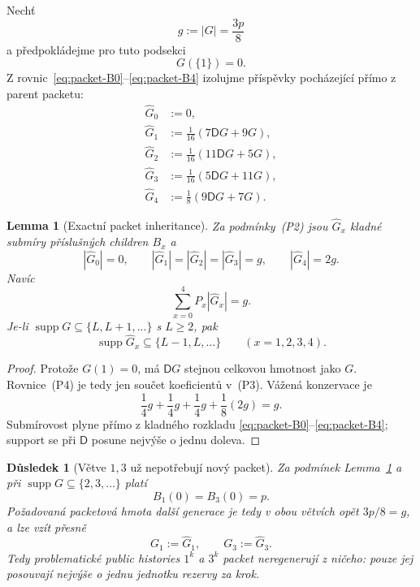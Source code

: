 \documentclass[11pt,a4paper]{article}
\newtheorem{lemma}[theorem]{Lemma}
\newtheorem{corollary}[theorem]{Důsledek}
\theoremstyle{definition}
\theoremstyle{remark}
\newcommand{\DOWN}{\mathsf D}
\newcommand{\supp}{\operatorname{supp}}
\begin{document}
Nech\v t
\[
g:=|G|=\frac{3p}{8}
\]
a p\v redpokl\'adejme pro tuto podsekci
\[
G(\{1\})=0.
\tag{P2}
\]
Z rovnic~\eqref{eq:packet-B0}--\eqref{eq:packet-B4} izolujme p\v r\'isp\v evky
poch\'azej\'ic\'i p\v r\'imo z parent packetu:
\begin{align}
\widehat G_0&:=0,\nonumber\\
\widehat G_1&:=\frac1{16}(7\DOWN G+9G),\nonumber\\
\widehat G_2&:=\frac1{16}(11\DOWN G+5G),\nonumber\\
\widehat G_3&:=\frac1{16}(5\DOWN G+11G),\nonumber\\
\widehat G_4&:=\frac1{8}(9\DOWN G+7G).
\tag{P3}
\end{align}

\begin{lemma}[Exactn\'i packet inheritance]
\label{lem:packet-inheritance}
Za podm\'inky~\textup{(P2)} jsou \(\widehat G_x\) kladn\'e subm\'iry
p\v r\'islu\v sn\'ych children \(B_x\) a
\[
\boxed{
|\widehat G_0|=0,\qquad
|\widehat G_1|=|\widehat G_2|=|\widehat G_3|=g,\qquad
|\widehat G_4|=2g.
}
\tag{P4}
\]
Nav\'ic
\[
\boxed{
\sum_{x=0}^4P_x|\widehat G_x|=g.
}
\tag{P5}
\]
Je-li \(\supp G\subseteq\{L,L+1,\ldots\}\) s \(L\ge2\), pak
\[
\supp\widehat G_x\subseteq\{L-1,L,\ldots\}
\qquad(x=1,2,3,4).
\tag{P6}
\]
\end{lemma}

\begin{proof}
Proto\v ze \(G(1)=0\), m\'a \(\DOWN G\) stejnou celkovou hmotnost jako
\(G\). Rovnice~\textup{(P4)} je tedy jen sou\v cet koeficient\r u
v~\textup{(P3)}. V\'a\v zen\'a konzervace je
\[
\frac14g+\frac14g+\frac14g+\frac18(2g)=g.
\]
Subm\'irovost plyne p\v r\'imo z kladn\'eho rozkladu
\eqref{eq:packet-B0}--\eqref{eq:packet-B4}; support se p\v ri
\(\DOWN\) posune nejv\'y\v se o jednu doleva.
\end{proof}

\begin{corollary}[V\v etve \(1,3\) u\v z nepot\v rebuj\'i nov\'y packet]
\label{cor:packet-13}
Za podm\'inek Lemma~\ref{lem:packet-inheritance} a p\v ri
\(\supp G\subseteq\{2,3,\ldots\}\) plat\'i
\[
B_1(0)=B_3(0)=p.
\]
Po\v zadovan\'a packetov\'a hmota dal\v s\'i generace je tedy v obou
v\v etv\'ich op\v et \(3p/8=g\), a lze vz\'it p\v resn\v e
\[
G_1:=\widehat G_1,\qquad G_3:=\widehat G_3.
\]
Tedy problematick\'e public histories \(1^k\) a \(3^k\) packet
\emph{neregeneruj\'i z ni\v ceho}: pouze jej posouvaj\'i nejv\'y\v se o
jednu jednotku rezervy za krok.
\end{corollary}
\end{document}
